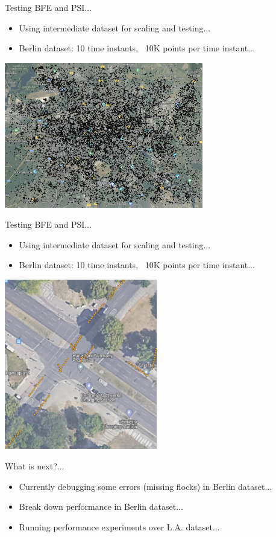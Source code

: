 \documentclass{beamer}
\begin{document}
\begin{frame}{Testing BFE and PSI...}
    \begin{itemize}
        \item Using intermediate dataset for scaling and testing...
        \item Berlin dataset: 10 time instants, ~10K points per time instant...
    \end{itemize}

    \centering
    \includegraphics[width=0.65\textwidth]{figures/berlin.png}
\end{frame}

\begin{frame}{Testing BFE and PSI...}
    \begin{itemize}
        \item Using intermediate dataset for scaling and testing...
        \item Berlin dataset: 10 time instants, ~10K points per time instant...
    \end{itemize}

    \centering
    \includegraphics[width=0.5\textwidth]{figures/sample.png}
\end{frame}

\begin{frame}{What is next?...}
    \begin{itemize}
        \item Currently debugging some errors (missing flocks) in Berlin dataset...
        \item Break down performance in Berlin dataset...
        \item Running performance experiments over L.A. dataset...
    \end{itemize}
\end{frame}

\end{document}
